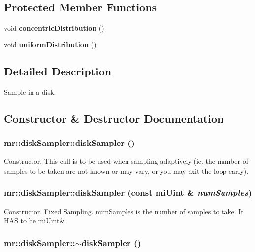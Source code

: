 \subsection*{Protected Member Functions}
\begin{CompactItemize}
\item 
void {\bf concentric\-Distribution} ()
\item 
void {\bf uniform\-Distribution} ()
\end{CompactItemize}


\subsection{Detailed Description}
Sample in a disk. 



\subsection{Constructor \& Destructor Documentation}
\subsubsection{\setlength{\rightskip}{0pt plus 5cm}mr::disk\-Sampler::disk\-Sampler ()\hspace{0.3cm}{\tt  [inline]}}\label{classmr_1_1diskSampler_a0}


Constructor. This call is to be used when sampling adaptively (ie. the number of samples to be taken are not known or may vary, or you may exit the loop early). 
\subsubsection{\setlength{\rightskip}{0pt plus 5cm}mr::disk\-Sampler::disk\-Sampler (const mi\-Uint \& {\em num\-Samples})\hspace{0.3cm}{\tt  [inline]}}\label{classmr_1_1diskSampler_a1}


Constructor. Fixed Sampling. num\-Samples is the number of samples to take. It HAS to be mi\-Uint\& 
\subsubsection{\setlength{\rightskip}{0pt plus 5cm}mr::disk\-Sampler::$\sim${\bf disk\-Sampler} ()\hspace{0.3cm}{\tt  [inline]}}\label{classmr_1_1diskSampler_a2}




